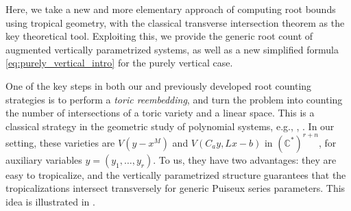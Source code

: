 \documentclass[11pt,reqno,a4paper]{amsart}
\numberwithin{equation}{section}
\theoremstyle{theoremstyle}
\theoremstyle{examplestyle}
\newcommand{\CC}{\mathbb{C}}
\begin{document}
Here, we take a new and more elementary approach of computing root bounds using tropical geometry, with the classical transverse intersection theorem as the key theoretical tool. Exploiting this, we provide the generic root count of augmented vertically parametrized systems, as well as a new simplified formula \eqref{eq:purely_vertical_intro}  for the purely vertical case.

 

One of the key steps in both our and previously developed root counting strategies is to perform a \emph{toric reembedding}, and turn the problem into counting the number of intersections of a toric variety and a linear space. This is a classical strategy in the geometric study of polynomial systems,  e.g., \cite[Chapter 6]{gelfand1994discriminants}, \cite[Section~3.2]{Sottile-book}. In our setting, these varieties are $V(y-x^M)$ and $V(C_ay,Lx-b)$ in $(\CC^\ast)^{r+n}$, for auxiliary variables $y=(y_1,\ldots,y_r)$. To us, they have two advantages:  they are easy to tropicalize, and the vertically parametrized structure guarantees that the tropicalizations intersect transversely for generic Puiseux series parameters. This idea is illustrated in . 
\end{document}
